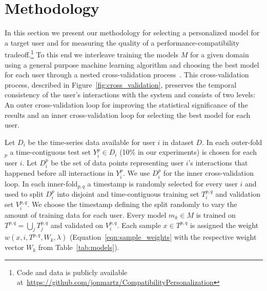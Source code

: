 \documentclass[letterpaper]{article} %
\theoremstyle{definition}
\begin{document}



%
\section{Methodology}
\label{sec:methodology}
%
In this  section we present  our  methodology for selecting a personalized model for a target user and for measuring the quality of a performance-compatibility tradeoff.\footnote{Code and data  is publicly available  at~\url{https://github.com/jonmartz/CompatibilityPersonalization}}
To this end we interleave training the models $M$ for a given domain using a general purpose machine learning algorithm and  choosing the  best model for each user through a nested  cross-validation process~\cite{tashman2000out}.
This cross-validation process, described in Figure~\ref{fig:cross_validation}, preserves the temporal consistency of the user's interactions with the system and consists of two levels: An outer cross-validation loop for improving the statistical significance of the results and an inner cross-validation loop for selecting the best model for each user. 

Let $D_i$ be the time-series data available for user $i$ in dataset $D$. In each outer-fold$_p$ a time-contiguous test set $Y_i^p\in D_i$ (10\% in our experiments) is chosen for each user $i$.
Let $D_i^p$ be the set of data points representing user $i$'s interactions that happened before all interactions in $Y_i^p$. We use $D_i^p$ for the inner cross-validation loop.
In each inner-fold$_{p,q}$ a timestamp is randomly selected for every user $i$ and used to split $D_i^p$ into disjoint and time-contiguous training set $T_i^{p,q}$ and validation set $V_i^{p,q}$.
We choose the timestamp defining the split randomly to vary the amount of training data for each user.
Every model $m_k\in M$ is trained on $T^{p,q}=\bigcup_j T_j^{p,q}$  and validated on $V_i^{p,q}$.
Each sample $x\in T^{p,q}$ is assigned the weight $w(x,i,T^{p,q},W_k,\lambda)$ (Equation~\ref{eqn:sample_weights} with the respective weight vector $W_k$ from Table~\ref{tab:models}). 
\end{document}
